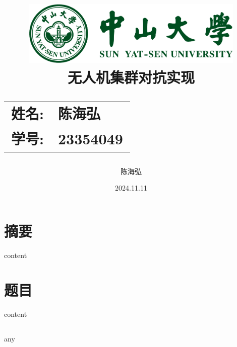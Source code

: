 \documentclass[12pt,a4paper,oneside,twocoulmn]{article}
\date{\Large 2024.11.11}
\author{陈海弘}
\title{
    \vspace*{-2cm}
    \includegraphics[width=0.8\textwidth]{SYSULogo.pdf} \\[1em]
    \vfill
    \LARGE \textbf{无人机集群对抗实现} \\[1em]
    \Large
    \begin{tabular}{rl}
        \textbf{姓名:} & \textbf{陈海弘} \\
        \textbf{学号:} & \textbf{23354049}
    \end{tabular}
    \vfill
}
\begin{document}
\maketitle
\newpage
\tableofcontents

\newpage
\section{摘要}
content
\section{题目}
content
\subsection{}
any
\end{document}
